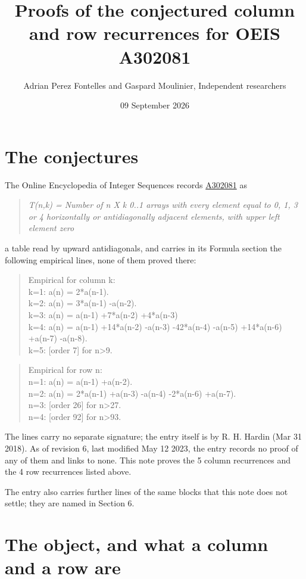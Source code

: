 \documentclass[11pt]{article}
\title{Proofs of the conjectured column and row recurrences for OEIS A302081}
\author{Adrian Perez Fontelles and Gaspard Moulinier, Independent researchers}
\date{09 September 2026}
\theoremstyle{definition}
\begin{document}
\maketitle
\section{The conjectures}

The Online Encyclopedia of Integer Sequences records \href{https://oeis.org/A302081}{A302081} as

\begin{quote}\itshape T(n,k) = Number of n X k 0..1 arrays with every element equal to 0, 1, 3 or 4 horizontally or antidiagonally adjacent elements, with upper left element zero\end{quote}

a table read by upward antidiagonals, and carries in its Formula section the following empirical lines, none of them proved there:

\begin{quote}\ttfamily Empirical for column k:\\
k=1: a(n) = 2*a(n-1).\\k=2: a(n) = 3*a(n-1) -a(n-2).\\k=3: a(n) = a(n-1) +7*a(n-2) +4*a(n-3)\\k=4: a(n) = a(n-1) +14*a(n-2) -a(n-3) -42*a(n-4) -a(n-5) +14*a(n-6) +a(n-7) -a(n-8).\\k=5: [order 7] for n>9.\end{quote}

\begin{quote}\ttfamily Empirical for row n:\\
n=1: a(n) = a(n-1) +a(n-2).\\n=2: a(n) = 2*a(n-1) +a(n-3) -a(n-4) -2*a(n-6) +a(n-7).\\n=3: [order 26] for n>27.\\n=4: [order 92] for n>93.\end{quote}

The lines carry no separate signature; the entry itself is by R. H. Hardin (Mar 31 2018). As of revision 6, last modified May 12 2023, the entry records no proof of any of them and links to none. This note proves the 5 column recurrences and the 4 row recurrences listed above.

The entry also carries further lines of the same blocks that this note does not settle; they are named in Section 6.

\section{The object, and what a column and a row are}
\end{document}
